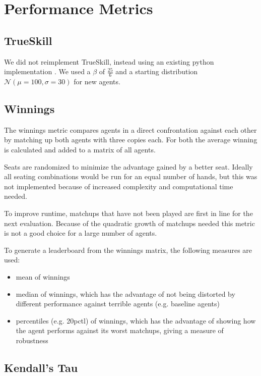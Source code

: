 \section{Performance Metrics}\label{PerformanceMetricsSection}

\subsection{TrueSkill}
We did not reimplement TrueSkill, instead using an existing python implementation \cite{TrueSkill_code}. We used a $\beta$ of $\frac{25}{6}$ and a starting distribution $\mathcal{N}(\mu=100, \sigma=30)$ for new agents.

\subsection{Winnings}
\label{Winnings}
The winnings metric compares agents in a direct confrontation against each other by matching up both agents with three copies each. For both the average winning is calculated and added to a matrix of all agents.

Seats are randomized to minimize the advantage gained by a better seat. Ideally all seating combinations would be run for an equal number of hands, but this was not implemented because of increased complexity and computational time needed.

To improve runtime, matchups that have not been played are first in line for the next evaluation. Because of the quadratic growth of matchups needed this metric is not a good choice for a large number of agents.

To generate a leaderboard from the winnings matrix, the following measures are used:
\begin{itemize}
    \item mean of winnings
    \item median of winnings, which has the advantage of not being distorted by different performance against terrible agents (e.g. baseline agents)
    \item percentiles (e.g. 20pctl) of winnings, which has the advantage of showing how the agent performs against its worst matchups, giving a measure of robustness
\end{itemize}

\subsection{Kendall's Tau}

